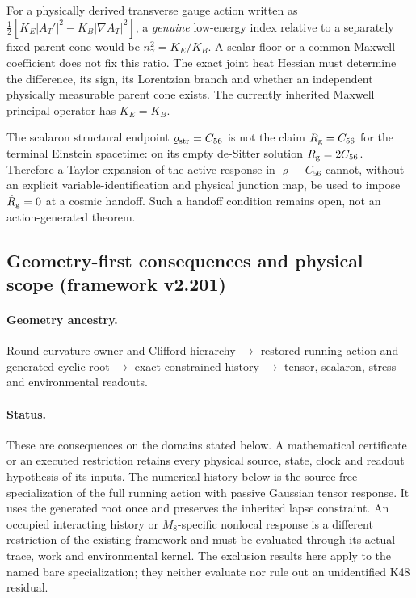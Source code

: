 \documentclass[12pt,a4paper]{article}
\begin{document}
\begin{remark}
For a physically derived transverse gauge action written as
$\frac12[K_E|A_T'|^2-K_B|\nabla A_T|^2]$, a \emph{genuine}
low-energy index relative to a separately fixed parent cone would be
$n_\gamma^2=K_E/K_B$.  A scalar floor or a common Maxwell coefficient
does not fix this ratio.  The exact joint heat Hessian must determine
the difference, its sign, its Lorentzian branch and whether an
independent physically measurable parent cone exists.  The currently
inherited Maxwell principal operator has $K_E=K_B$.
\end{remark}
\begin{remark}
The scalaron structural endpoint $\varrho_{\rm str}=C_{56}$ is not the
claim $R_{\rm g}=C_{56}$ for the terminal Einstein spacetime: on its
empty de-Sitter solution $R_{\rm g}=2C_{56}$.  Therefore a Taylor
expansion of the active response in $\varrho-C_{56}$ cannot, without
an explicit variable-identification and physical junction map, be used
to impose $\dot R_{\rm g}=0$ at a cosmic handoff.  Such a handoff
condition remains open, not an action-generated theorem.
\end{remark}



\setlength{\emergencystretch}{2em}
\subsection{Geometry-first consequences and physical scope (framework v2.201)}
\label{p8:sec:v2201-geometry-first-consequences}
\paragraph{Geometry ancestry.}
Round curvature owner and Clifford hierarchy $\to$ restored running action and generated cyclic root $\to$ exact constrained history $\to$ tensor, scalaron, stress and environmental readouts.
\paragraph{Status.}
These are consequences on the domains stated below.
A mathematical certificate or an executed restriction retains every
physical source, state, clock and readout hypothesis of its inputs.
The numerical history below is the source-free specialization
of the full running action with passive Gaussian tensor response. It uses
the generated root once and preserves the inherited lapse constraint.
An occupied interacting history or $M_8$-specific nonlocal response is a
different restriction of the existing framework and must be evaluated
through its actual trace, work and environmental kernel. The exclusion
results here apply to the named bare specialization; they neither
evaluate nor rule out an unidentified K48 residual.
\end{document}
